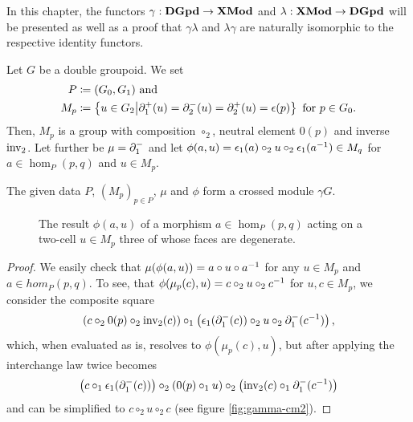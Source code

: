 In this chapter, the functors $\gamma : \mathbf{DGpd} \to \mathbf{XMod}$ and
$\lambda : \mathbf{XMod} \to \mathbf{DGpd}$ will be presented as well as a proof that $\gamma \lambda$
and $\lambda \gamma$ are naturally isomorphic to the respective identity functors.

\begin{lemma}
Let $G$ be a double groupoid. We set
\begin{align*}
P &\coloneqq (G_0,G_1) \text{ and } \\
M_p &\coloneqq \left\{ u \in G_2 \middle| \partial^+_1(u) = \partial^-_2(u) = \partial^+_2(u) = \epsilon(p) \right\}
	\text{ for $p \in G_0$.}
\end{align*}
Then, $M_p$ is a group with composition $\circ_2$, neutral element $0(p)$ and
inverse $\operatorname{inv_2}$.
Let further be $\mu = \partial^-_1$ and let $\phi(a,u) =
\epsilon_1(a) \circ_2 u \circ_2 \epsilon_1(a^{-1}) \in M_q$ for $a \in \hom_P(p,q)$
and $u \in M_p$.

The given data $P$, $(M_p)_{p \in P}$, $\mu$ and $\phi$ form a crossed module $\gamma G$.
\end{lemma}

\begin{figure} \centering
{}
\caption{The result $\phi(a,u)$ of a morphism $a \in \hom_P(p,q)$ acting
on a two-cell $u \in M_p$ three of whose faces are degenerate.}
\label{fig:gamma-phi}
\end{figure}

\begin{proof}
We easily check that $\mu(\phi(a,u)) = a \circ u \circ a^{-1}$ for any $u \in M_p$
and $a \in hom_P(p,q)$.
To see, that $\phi(\mu_p(c),u) = c \circ_2 u \circ_2 c^{-1}$ for $u,c \in M_p$,
we consider the composite square
\begin{equation*}
\left(c \circ_2 0(p) \circ_2 \operatorname{inv_2}(c)\right) \circ_1
	\left(\epsilon_1(\partial^-_1(c)) \circ_2 u \circ_2 \partial^-_1(c^{-1})\right) \text{,}
\end{equation*}
which, when evaluated as is, resolves to $\phi(\mu_p(c),u)$, but after applying
the interchange law twice becomes
\begin{equation*}
\left(c \circ_1 \epsilon_1(\partial^-_1(c))\right)
	\circ_2 \left(0(p) \circ_1 u\right)
	\circ_2 \left(\operatorname{inv_2}(c) \circ_1 \partial^-_1(c^{-1})\right)
\end{equation*}
and can be simplified to $c \circ_2 u \circ_2 c$ (see figure \ref{fig:gamma-cm2}).
\end{proof}

